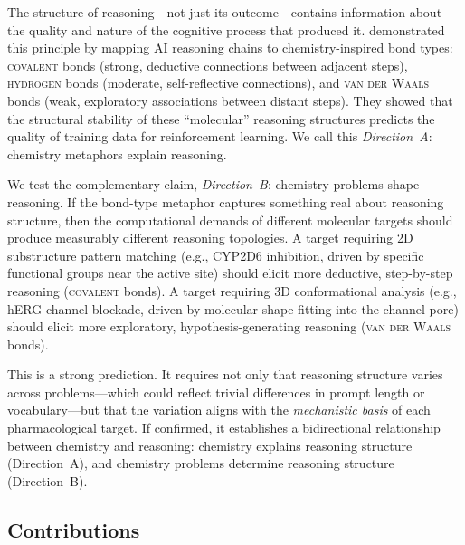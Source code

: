 \documentclass[11pt]{article}
\newcommand{\cov}{\textsc{covalent}}
\newcommand{\hyd}{\textsc{hydrogen}}
\newcommand{\vdw}{\textsc{van der Waals}}
\begin{document}
The structure of reasoning---not just its outcome---contains information about the quality and nature of the cognitive process that produced it. \citet{chen2026molecular} demonstrated this principle by mapping AI reasoning chains to chemistry-inspired bond types: \cov{} bonds (strong, deductive connections between adjacent steps), \hyd{} bonds (moderate, self-reflective connections), and \vdw{} bonds (weak, exploratory associations between distant steps). They showed that the structural stability of these ``molecular'' reasoning structures predicts the quality of training data for reinforcement learning. We call this \emph{Direction~A}: chemistry metaphors explain reasoning.

We test the complementary claim, \emph{Direction~B}: chemistry problems shape reasoning. If the bond-type metaphor captures something real about reasoning structure, then the computational demands of different molecular targets should produce measurably different reasoning topologies. A target requiring 2D substructure pattern matching (e.g., CYP2D6 inhibition, driven by specific functional groups near the active site) should elicit more deductive, step-by-step reasoning (\cov{} bonds). A target requiring 3D conformational analysis (e.g., hERG channel blockade, driven by molecular shape fitting into the channel pore) should elicit more exploratory, hypothesis-generating reasoning (\vdw{} bonds).

This is a strong prediction. It requires not only that reasoning structure varies across problems---which could reflect trivial differences in prompt length or vocabulary---but that the variation aligns with the \emph{mechanistic basis} of each pharmacological target. If confirmed, it establishes a bidirectional relationship between chemistry and reasoning: chemistry explains reasoning structure (Direction~A), and chemistry problems determine reasoning structure (Direction~B).

\subsection{Contributions}
\end{document}
